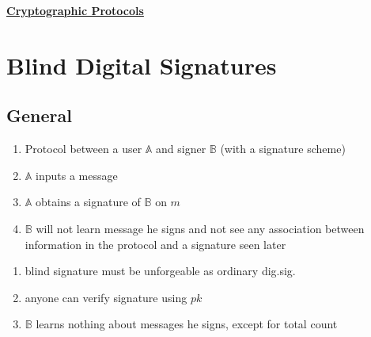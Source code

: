 \documentclass{report}
\begin{document}
\begin{center}
\huge{\textbf{\underline{Cryptographic Protocols}}}
\end{center}
 
{\let\clearpage\relax \chapter{Blind Digital Signatures}}

\section{General}
\begin{adjustwidth}{2em}{2em}
	\begin{enumerate}[-]
		\item Protocol between a user $\mathbb{A}$ and signer $\mathbb{B}$ (with a signature scheme)
		\item $\mathbb{A}$ inputs a message
		\item $\mathbb{A}$ obtains a signature of $\mathbb{B}$ on $m$
		\item $\mathbb{B}$ will not learn message he signs and not see any association between information in the protocol and a signature seen later
	\end{enumerate}
	\begin{tikzpicture}
	\end{tikzpicture}
	\begin{enumerate}[-]
		\item blind signature must be unforgeable as ordinary dig.sig.
		\item anyone can verify signature using $pk$
		\item $\mathbb{B}$ learns nothing about messages he signs, except for total count
	\end{enumerate}
\end{adjustwidth}
\end{document}
